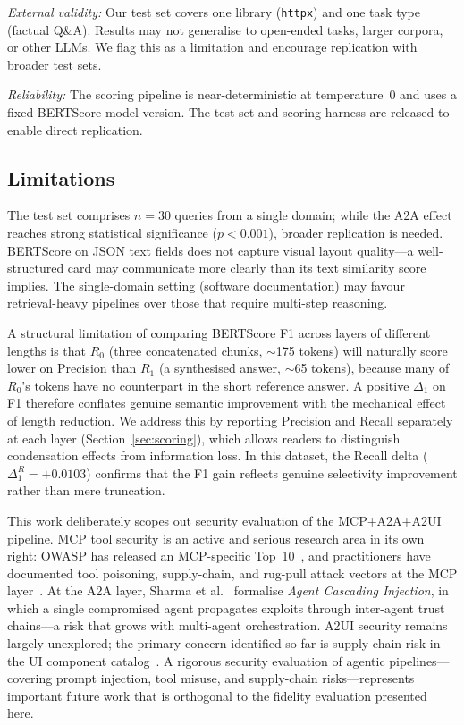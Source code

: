 \documentclass[10pt,journal,compsoc]{IEEEtran}
\begin{document}
\emph{External validity:} Our test set covers one library (\texttt{httpx}) and
one task type (factual Q\&A). Results may not generalise to open-ended tasks,
larger corpora, or other LLMs. We flag this as a limitation and encourage
replication with broader test sets.

\emph{Reliability:} The scoring pipeline is near-deterministic at temperature~0
and uses a fixed BERTScore model version. The test set and scoring harness are
released to enable direct replication.

\subsection{Limitations}
\label{sec:limitations}

The test set comprises $n=30$ queries from a single domain; while the A2A effect
reaches strong statistical significance ($p<0.001$), broader replication is
needed. BERTScore on JSON text
fields does not capture visual layout quality---a well-structured card may
communicate more clearly than its text similarity score implies. The single-domain
setting (software documentation) may favour retrieval-heavy pipelines over those
that require multi-step reasoning.

A structural limitation of comparing BERTScore F1 across layers of different
lengths is that $R_0$ (three concatenated chunks, $\sim$175 tokens) will naturally
score lower on Precision than $R_1$ (a synthesised answer, $\sim$65 tokens),
because many of $R_0$'s tokens have no counterpart in the short reference answer.
A positive $\Delta_1$ on F1 therefore conflates genuine semantic improvement with
the mechanical effect of length reduction. We address this by reporting Precision
and Recall separately at each layer (Section~\ref{sec:scoring}), which allows
readers to distinguish condensation effects from information loss. In this
dataset, the Recall delta ($\Delta_1^R = +0.0103$) confirms that the F1 gain
reflects genuine selectivity improvement rather than mere truncation.

This work deliberately scopes out security evaluation of the MCP+A2A+A2UI
pipeline. MCP tool security is an active and serious research area in its own
right: OWASP has released an MCP-specific
Top~10~\cite{owasp2025mcptop10}, and practitioners have documented tool
poisoning, supply-chain, and rug-pull attack vectors at the MCP
layer~\cite{mitra2026stack}. At the A2A layer, Sharma et
al.~\cite{sharma2025cascading} formalise \emph{Agent Cascading Injection}, in
which a single compromised agent propagates exploits through inter-agent trust
chains---a risk that grows with multi-agent orchestration. A2UI security remains
largely unexplored; the primary concern identified so far is supply-chain risk in
the UI component catalog~\cite{mitra2026stack}. A rigorous security evaluation of
agentic pipelines---covering prompt injection, tool misuse, and supply-chain
risks---represents important future work that is orthogonal to the fidelity
evaluation presented here.
\end{document}
